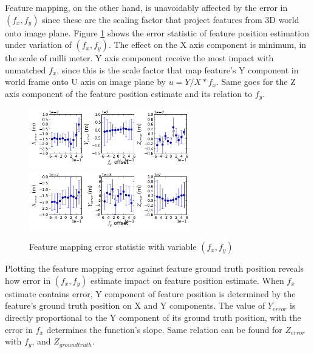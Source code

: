 Feature mapping, on the other hand, is unavoidably affected by the error
in $(f_x, f_y)$ since these are the scaling factor that project
features from 3D world onto image plane. Figure \ref{fig:simfig38-39}
shows the error statistic of feature position estimation under
variation of $(f_x, f_y)$. The effect on the X axis component is
minimum, in the scale of milli meter. Y axis component receive the
most impact with unmatched $f_x$, since this is the scale factor that
map feature's Y component in world frame onto U axis on image plane by
$u = Y/X*f_x$. Same goes for the Z axis component of the feature
position estimate and its relation to $f_y$.
\begin{figure}[h]
  \centering
  \includegraphics[width=7cm,keepaspectratio=true]{./Figures/SimulationFigures/Figure38.png}
  \includegraphics[width=7cm,keepaspectratio=true]{./Figures/SimulationFigures/Figure39.png}
  \caption{Feature mapping error statistic with variable $(f_x, f_y)$}
  \label{fig:simfig38-39}
\end{figure}

Plotting the feature mapping error against feature ground truth
position reveals how error in $(f_x, f_y)$ estimate impact on feature
position estimate. When $f_x$ estimate contains error, Y component of
feature position is determined by the feature's ground truth position
on X and Y components. The value of $Y_{error}$ is directly proportional
to the Y component of its ground truth position, with the error in
$f_x$ determines the function's slope. Same relation can be found for
$Z_{error}$ with $f_y$, and $Z_{ground truth}$.

